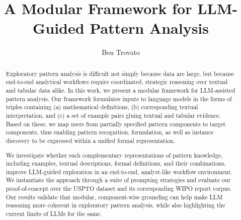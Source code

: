\documentclass[sigconf,nonacm,anonymous]{acmart}
\begin{document}
\title{A Modular Framework for LLM-Guided Pattern Analysis}

\author{Ben Trovato}

\begin{abstract}
Exploratory pattern analysis is difficult not simply because data are large, but because end-to-end analytical workflows require coordinated, strategic reasoning over textual and tabular data alike. In this work, we present a modular framework for LLM-assisted pattern analysis. Our framework formulates inputs to language models in the forms of triples containing (a) mathematical definitions, (b) corresponding textual interpretation, and (c) a set of example pairs gluing textual and tabular evidence. Based on these, we map users from partially specified pattern components to target components, thus enabling pattern recognition, formulation, as well as instance discovery to be expressed within a unified formal representation. 

We investigate whether such complementary representations of pattern knowledge, including examples, textual descriptions, formal definitions, and their combinations, improve LLM-guided exploration in an end-to-end, analyst-like workflow environment. We instantiate the approach through a suite of prompting strategies and evaluate our proof-of-concept over the USPTO dataset and its corresponding WIPO report corpus. Our results validate that modular, component-wise grounding can help make LLM reasoning more coherent in exploratory pattern analysis, while also highlighting the current limits of LLMs for the same.
\end{abstract}

\maketitle
\end{document}
